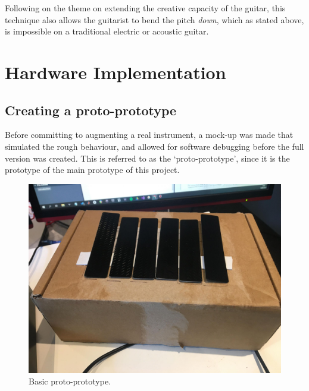 Following on the theme on extending the creative capacity of the guitar, this technique also allows the guitarist to bend the pitch \textit{down}, which as stated above, is impossible on a traditional electric or acoustic guitar. 

\section{Hardware Implementation}


\subsection{Creating a proto-prototype}

Before committing to augmenting a real instrument, a mock-up was made that simulated the rough behaviour, and allowed for software debugging before the full version was created. This is referred to as the `proto-prototype', since it is the prototype of the main prototype of this project. 

\begin{figure}[h]
    \centering
    \includegraphics[scale=0.12]{Images/prototype.jpg}
    \caption{Basic proto-prototype.}
    \label{fig:protoprototype}
\end{figure}

